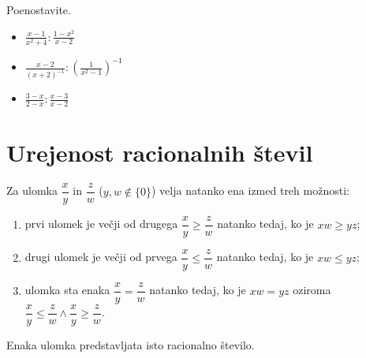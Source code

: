         
            \begin{naloga}
                Poenostavite.
                \begin{itemize}
                    \item $\frac{x-1}{x^2+4}:\frac{1-x^2}{x-2}$ 
                    \item $\frac{x-2}{(x+2)^{-1}}:\left(\frac{1}{x^2-1}\right)^{-1}$ 
                    \item $\frac{3-x}{2-x}:\frac{x-3}{x-2}$ 
                \end{itemize}
            \end{naloga}
        

\newpage

\section{Urejenost racionalnih števil}

            
    
                    Za ulomka $\dfrac{x}{y}$ in $\dfrac{z}{w}$ ($y,w\notin\{0\}$) velja natanko ena izmed treh možnosti:
                    
                    \begin{enumerate}
                        \item prvi ulomek je večji od drugega $\dfrac{x}{y}\geq\dfrac{z}{w}$ natanko tedaj, ko je $xw\geq yz$;
                        \item drugi ulomek je večji od prvega $\dfrac{x}{y}\leq\dfrac{z}{w}$ natanko tedaj, ko je $xw\leq yz$;
                        \item ulomka sta enaka $\dfrac{x}{y}=\dfrac{z}{w}$ natanko tedaj, ko je $xw=yz$ oziroma $\dfrac{x}{y}\leq\dfrac{z}{w} \land \dfrac{x}{y}\geq\dfrac{z}{w}$.
                    \end{enumerate}
    
    
                    Enaka ulomka predstavljata isto racionalno število.
    
                    ~

